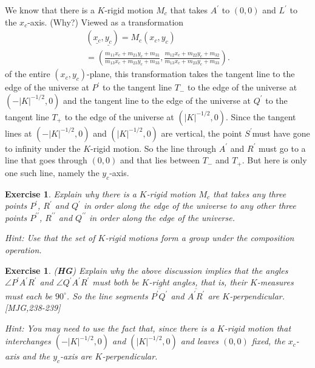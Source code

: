 \documentclass{article}%
\newtheorem{exercise}[theorem]{Exercise}
\begin{document}
We know that there is a $K$-rigid motion $M_{c}$ that takes $A^{\prime}$ to
$\left(  0,0\right)  $ and $L^{\prime}$ to the $x_{c}$-axis. (Why?) Viewed as
a transformation
\begin{gather*}
\left(  \underline{x_{c}},\underline{y_{c}}\right)  =M_{c}\left(  x_{c}%
,y_{c}\right) \\
=\left(  \frac{m_{11}x_{c}+m_{21}y_{c}+m_{31}}{m_{13}x_{c}+m_{23}y_{c}+m_{33}%
},\frac{m_{12}x_{c}+m_{22}y_{c}+m_{32}}{m_{13}x_{c}+m_{23}y_{c}+m_{33}%
}\right)  .
\end{gather*}
of the entire $\left(  x_{c},y_{c}\right)  $-plane, this transformation takes
the tangent line to the edge of the universe at $P^{\prime}$ to the tangent
line $T_{-}$ to the edge of the universe at $\left(  -\left\vert K\right\vert
^{-1/2},0\right)  $ and the tangent line to the edge of the universe at
$Q^{\prime}$ to the tangent line $T_{+}$ to the edge of the universe at
$\left(  \left\vert K\right\vert ^{-1/2},0\right)  $. Since the tangent lines
at $\left(  -\left\vert K\right\vert ^{-1/2},0\right)  $ and $\left(
\left\vert K\right\vert ^{-1/2},0\right)  $ are vertical, the point
$S^{\prime}$must have gone to infinity under the $K$-rigid motion. So the line
through $A^{\prime}$ and $R^{\prime}$ must go to a line that goes through
$\left(  0,0\right)  $ and that lies between $T_{-}$ and $T_{+}$. But here is
only one such line, namely the $y_{c}$-axis.

\begin{exercise}
\label{99}Explain why there is a $K$-rigid motion $M_{c}$ that takes any three
points $P^{\prime}$, $R^{\prime}$ and $Q^{\prime}$ in order along the edge of
the universe to any other three points $P^{\prime\prime}$, $R^{\prime\prime}$
and $Q^{\prime\prime}$ in order along the edge of the universe.

Hint: Use that the set of $K$-rigid motions form a group under the composition operation.
\end{exercise}

\begin{exercise}
(\textbf{HG}) Explain why the above discussion implies that the angles $\angle
P^{\prime}A^{\prime}R^{\prime}$ and $\angle Q^{\prime}A^{\prime}R^{\prime}$
must both be $K$-right angles, that is, their $K$-measures must each be
$90^{\circ}$. So the line segments $\overline{P^{\prime}Q^{\prime}}$ and
$\overline{A^{\prime}R^{\prime}}$ are $K$-perpendicular. [MJG,238-239]

Hint: You may need to use the fact that, since there is a $K$-rigid motion
that interchanges $\left(  -\left\vert K\right\vert ^{-1/2},0\right)  $ and
$\left(  \left\vert K\right\vert ^{-1/2},0\right)  $ and leaves $\left(
0,0\right)  $ fixed, the $x_{c}$-axis and the $y_{c}$-axis are $K$-perpendicular.
\end{exercise}
\end{document}
